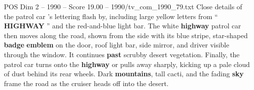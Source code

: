 \begin{textsample}{POS Dim 2 – 1990 – Score 19.00 – 1990/tv\_com\_1990\_79.txt}
Close details of the patrol car ’s lettering flash by, including large yellow letters from “ \textbf{HIGHWAY} ” and the red-and-blue light bar.
The white \textbf{highway} patrol car then moves along the road, shown from the side with its blue stripe, star-shaped \textbf{badge} \textbf{emblem} on the door, roof light bar, side mirror, and driver visible through the window.
It continues \textbf{past} scrubby desert vegetation.
Finally, the patrol car turns onto the \textbf{highway} or pulls away sharply, kicking up a pale cloud of dust behind its rear wheels.
Dark \textbf{mountains}, tall cacti, and the fading \textbf{sky} frame the road as the cruiser heads off into the desert.

\end{textsample}
